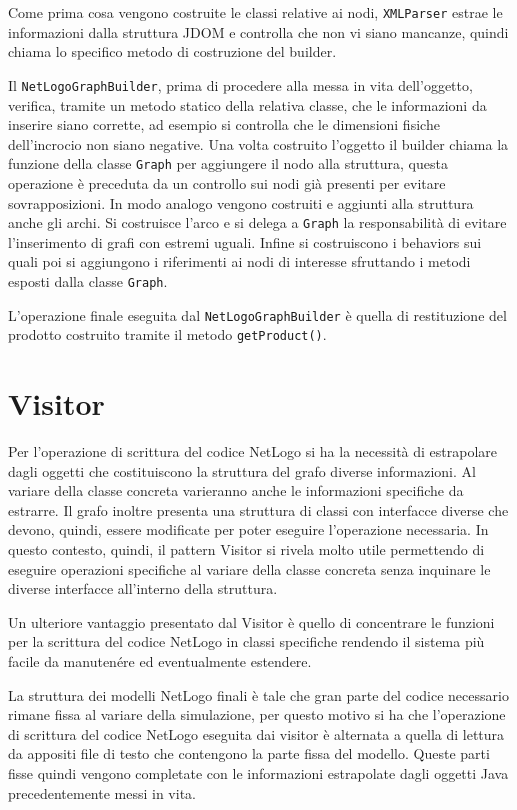 Come prima cosa vengono costruite le classi relative ai nodi, \texttt{XMLParser} estrae le informazioni dalla struttura JDOM e controlla che non vi siano mancanze, quindi chiama lo specifico metodo di costruzione del builder.

Il \texttt{NetLogoGraphBuilder}, prima di procedere alla messa in vita dell'oggetto, verifica, tramite un metodo statico della relativa classe, che le informazioni da inserire siano corrette, ad esempio si controlla che le dimensioni fisiche dell'incrocio non siano negative. Una volta costruito l'oggetto il builder chiama la funzione della classe \texttt{Graph} per aggiungere il nodo alla struttura, questa operazione è preceduta da un controllo sui nodi già presenti per evitare sovrapposizioni. In modo analogo vengono costruiti e aggiunti alla struttura anche gli archi. Si costruisce l'arco e si delega a \texttt{Graph} la responsabilità di evitare l'inserimento di grafi con estremi uguali. Infine si costruiscono i behaviors sui quali poi si aggiungono i riferimenti ai nodi di interesse sfruttando i metodi esposti dalla classe \texttt{Graph}.

L'operazione finale eseguita dal \texttt{NetLogoGraphBuilder} è quella di restituzione del prodotto costruito tramite il metodo \texttt{getProduct()}.

\section{Visitor}
\label{subsec:visitor}
Per l'operazione di scrittura del codice NetLogo si ha la necessità di estrapolare dagli oggetti che costituiscono la struttura del grafo diverse informazioni. Al variare della classe concreta varieranno anche le informazioni specifiche da estrarre. Il grafo inoltre presenta una struttura di classi con interfacce diverse che devono, quindi, essere modificate per poter eseguire l'operazione necessaria. In questo contesto, quindi, il pattern Visitor si rivela molto utile permettendo di eseguire operazioni specifiche al variare della classe concreta senza inquinare le diverse interfacce all'interno della struttura.

Un ulteriore vantaggio presentato dal Visitor è quello di concentrare le funzioni per la scrittura del codice NetLogo in classi specifiche rendendo il sistema più facile da manutenére ed eventualmente estendere.

La struttura dei modelli NetLogo finali è tale che gran parte del codice necessario rimane fissa al variare della simulazione, per questo motivo si ha che l'operazione di scrittura del codice NetLogo eseguita dai visitor è alternata a quella di lettura da appositi file di testo che contengono la parte fissa del modello. Queste parti fisse quindi vengono completate con le informazioni estrapolate dagli oggetti Java precedentemente messi in vita.

